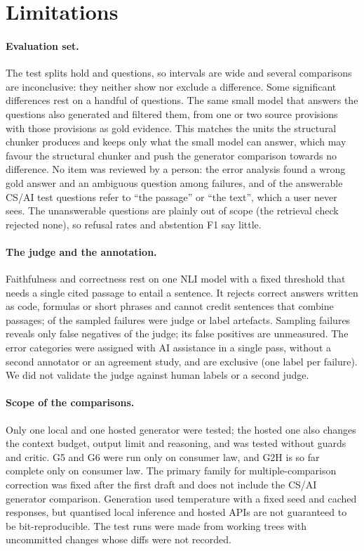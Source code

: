 \section{Limitations}
\label{sec:limitations}

\paragraph{Evaluation set.}
The test splits hold  and  questions, so intervals are wide and several comparisons are inconclusive: they neither show nor exclude a difference. Some significant differences rest on a handful of questions.
The same small model that answers the questions also generated and filtered them, from one or two source provisions with those provisions as gold evidence. This matches the units the structural chunker produces and keeps only what the small model can answer, which may favour the structural chunker and push the generator comparison towards no difference.
No item was reviewed by a person: the error analysis found a wrong gold answer and an ambiguous question among  failures, and  of the  answerable CS/AI test questions refer to ``the passage'' or ``the text'', which a user never sees.
The unanswerable questions are plainly out of scope (the retrieval check rejected none), so refusal rates and abstention F1 say little.

\paragraph{The judge and the annotation.}
Faithfulness and correctness rest on one NLI model with a fixed threshold that needs a single cited passage to entail a sentence. It rejects correct answers written as code, formulas or short phrases and cannot credit sentences that combine passages;  of the  sampled failures were judge or label artefacts.
Sampling failures reveals only false negatives of the judge; its false positives are unmeasured. The error categories were assigned with AI assistance in a single pass, without a second annotator or an agreement study, and are exclusive (one label per failure). We did not validate the judge against human labels or a second judge.

\paragraph{Scope of the comparisons.}
Only one local and one hosted generator were tested; the hosted one also changes the context budget, output limit and reasoning, and was tested without guards and critic. G5 and G6 were run only on consumer law\ifcsGtwoHready\else, and G2H is so far complete only on consumer law\fi.
The primary family for multiple-comparison correction was fixed after the first draft and does not include the CS/AI generator comparison.
Generation used temperature  with a fixed seed and cached responses, but quantised local inference and hosted APIs are not guaranteed to be bit-reproducible. The test runs were made from working trees with uncommitted changes whose diffs were not recorded.

